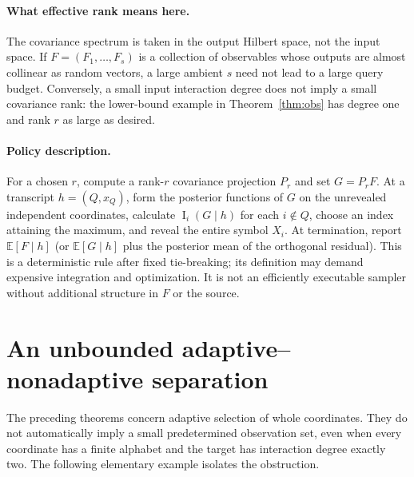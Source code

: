 \documentclass[11pt,letterpaper]{article}
\theoremstyle{definition}
\newcommand{\E}{\mathbb E}
\newcommand{\Inf}{\operatorname{I}}
\begin{document}
\paragraph{What effective rank means here.}
The covariance spectrum is taken in the output Hilbert space, not the
input space. If $F=(F_1,\ldots,F_s)$ is a collection of observables whose
outputs are almost collinear as random vectors, a large ambient $s$ need
not lead to a large query budget. Conversely, a small input interaction
degree does not imply a small covariance rank: the lower-bound example
in Theorem~\ref{thm:obs} has degree one and rank $r$ as large as desired.

\paragraph{Policy description.}
For a chosen $r$, compute a rank-$r$ covariance projection $P_r$ and set
$G=P_rF$. At a transcript $h=(Q,x_Q)$, form the posterior functions of
$G$ on the unrevealed independent coordinates, calculate
$\Inf_i(G\mid h)$ for each $i\notin Q$, choose an index attaining the
maximum, and reveal the entire symbol $X_i$. At termination, report
$\E[F\mid h]$ (or $\E[G\mid h]$ plus the posterior mean of the
orthogonal residual). This is a deterministic rule after fixed
tie-breaking; its definition may demand expensive integration and
optimization. It is not an efficiently executable sampler without
additional structure in $F$ or the source.

\section{An unbounded adaptive--nonadaptive separation}\label{sec:address}
The preceding theorems concern adaptive selection of whole coordinates.
They do not automatically imply a small predetermined observation set,
even when every coordinate has a finite alphabet and the target has
interaction degree exactly two. The following elementary example isolates
the obstruction.
\end{document}
